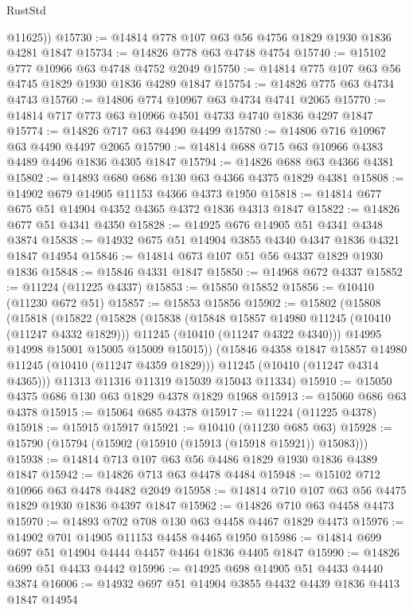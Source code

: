 \begin{lexlean}{RustStd}
\begin{coremodule}
        @11625))
@15730 := @14814 @778 @107 @63 @56 @4756 @1829 @1930 @1836 @4281 @1847
@15734 := @14826 @778 @63 @4748 @4754
@15740 := @15102 @777 @10966 @63 @4748 @4752 @2049
@15750 := @14814 @775 @107 @63 @56 @4745 @1829 @1930 @1836 @4289 @1847
@15754 := @14826 @775 @63 @4734 @4743
@15760 := @14806 @774 @10967 @63 @4734 @4741 @2065
@15770 := @14814 @717 @773 @63 @10966 @4501 @4733 @4740 @1836 @4297 @1847
@15774 := @14826 @717 @63 @4490 @4499
@15780 := @14806 @716 @10967 @63 @4490 @4497 @2065
@15790 := @14814 @688 @715 @63 @10966 @4383 @4489 @4496 @1836 @4305 @1847
@15794 := @14826 @688 @63 @4366 @4381
@15802 := @14893 @680 @686 @130 @63 @4366 @4375 @1829 @4381
@15808 := @14902 @679 @14905 @11153 @4366 @4373 @1950
@15818 := @14814 @677 @675 @51 @14904 @4352 @4365 @4372 @1836 @4313 @1847
@15822 := @14826 @677 @51 @4341 @4350
@15828 := @14925 @676 @14905 @51 @4341 @4348 @3874
@15838 := @14932 @675 @51 @14904 @3855 @4340 @4347 @1836 @4321 @1847 @14954
@15846 := @14814 @673 @107 @51 @56 @4337 @1829 @1930 @1836
@15848 := @15846 @4331 @1847
@15850 := @14968 @672 @4337
@15852 := @11224 (@11225 @4337)
@15853 := @15850 @15852
@15856 := @10410 (@11230 @672 @51)
@15857 := @15853 @15856
@15902 := @15802
    (@15808
      (@15818
        (@15822
          (@15828
            (@15838
              (@15848 @15857 @14980 @11245 (@10410 (@11247 @4332 @1829)))
              @11245
              (@10410 (@11247 @4322 @4340)))
            @14995
            @14998
            @15001
            @15005
            @15009
            @15015))
        (@15846 @4358 @1847 @15857 @14980 @11245 (@10410 (@11247 @4359 @1829)))
        @11245
        (@10410 (@11247 @4314 @4365)))
      @11313
      @11316
      @11319
      @15039
      @15043
      @11334)
@15910 := @15050 @4375 @686 @130 @63 @1829 @4378 @1829 @1968
@15913 := @15060 @686 @63 @4378
@15915 := @15064 @685 @4378
@15917 := @11224 (@11225 @4378)
@15918 := @15915 @15917
@15921 := @10410 (@11230 @685 @63)
@15928 := @15790 (@15794 (@15902 (@15910 (@15913 (@15918 @15921)) @15083)))
@15938 := @14814 @713 @107 @63 @56 @4486 @1829 @1930 @1836 @4389 @1847
@15942 := @14826 @713 @63 @4478 @4484
@15948 := @15102 @712 @10966 @63 @4478 @4482 @2049
@15958 := @14814 @710 @107 @63 @56 @4475 @1829 @1930 @1836 @4397 @1847
@15962 := @14826 @710 @63 @4458 @4473
@15970 := @14893 @702 @708 @130 @63 @4458 @4467 @1829 @4473
@15976 := @14902 @701 @14905 @11153 @4458 @4465 @1950
@15986 := @14814 @699 @697 @51 @14904 @4444 @4457 @4464 @1836 @4405 @1847
@15990 := @14826 @699 @51 @4433 @4442
@15996 := @14925 @698 @14905 @51 @4433 @4440 @3874
@16006 := @14932 @697 @51 @14904 @3855 @4432 @4439 @1836 @4413 @1847 @14954

\end{coremodule}
\end{lexlean}
